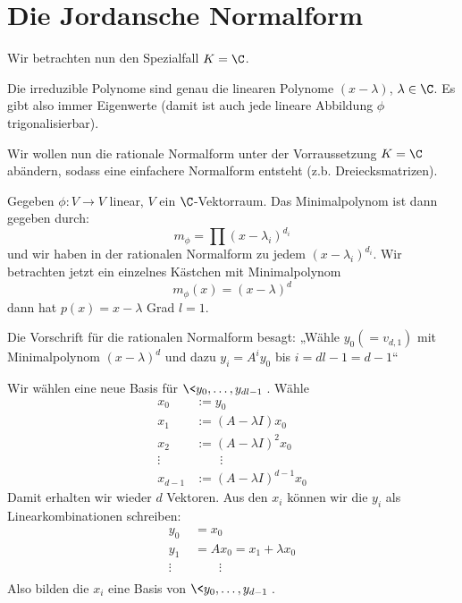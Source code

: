 \documentclass{mycourse}
\begin{document}
\section{Die Jordansche Normalform}


Wir betrachten nun den Spezialfall $K=\C$.

Die irreduzible Polynome sind genau die linearen Polynome $(x-\lambda)$, $\lambda \in \C$.
Es gibt also immer Eigenwerte (damit ist auch jede lineare Abbildung $\phi$ trigonalisierbar).

Wir wollen nun die rationale Normalform unter der Vorraussetzung $K=\C$ abändern, sodass eine einfachere Normalform entsteht (z.b. Dreiecksmatrizen).

Gegeben $\phi : V\to V$ linear, $V$ ein $\C$-Vektorraum.
Das Minimalpolynom ist dann gegeben durch:
\[
	m_\phi = \prod (x-\lambda_i)^{d_i}
\]
und wir haben in der rationalen Normalform zu jedem $(x-\lambda_i)^{d_i}$.
Wir betrachten jetzt ein einzelnes Kästchen mit Minimalpolynom
\[
	m_\phi(x) = (x-\lambda)^d
\]
dann hat $p(x) = x-\lambda$ Grad $l=1$.

Die Vorschrift für die rationalen Normalform besagt:
„Wähle $y_0 (= v_{d,1})$ mit Minimalpolynom $(x-\lambda)^d$ und dazu $y_i = A^iy_0$ bis $i=dl-1=d-1$“

Wir wählen eine neue Basis für $\<y_0,\dotsc,y_{dl-1}\>$.
Wähle 
\begin{align*}
	x_0 &:= y_0\\
	x_1 &:= (A - \lambda I)x_0\\
	x_2 &:= (A - \lambda I)^2x_0\\
	\vdots \quad & \qquad \vdots\\
	x_{d-1} &:= (A-\lambda I)^{d-1}x_0
\end{align*}
Damit erhalten wir wieder $d$ Vektoren.
Aus den $x_i$ können wir die $y_i$ als Linearkombinationen schreiben:
\begin{align*}
	y_0 &= x_0\\
	y_1 &= Ax_0 = x_1 + \lambda x_0\\
	\vdots \quad & \qquad \vdots\\
\end{align*}
Also bilden die $x_i$ eine Basis von $\<y_0,\dotsc, y_{d-1}\>$.
\end{document}
